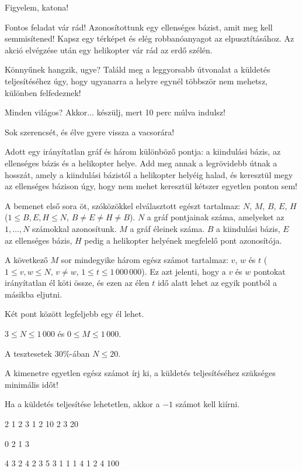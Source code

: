 





\noindent
Figyelem, katona!

\bigskip \noindent
Fontos feladat vár rád! Azonosítottunk egy ellenséges bázist, amit meg kell semmisítened! Kapsz egy térképet és elég robbanóanyagot az elpusztításához. Az akció elvégzése után egy helikopter vár rád az erdő szélén.

\bigskip \noindent
Könnyűnek hangzik, ugye? Találd meg a leggyorsabb útvonalat a küldetés teljesítéséhez úgy, hogy ugyanarra a helyre egynél többször nem mehetsz, különben felfedeznek!

\bigskip \noindent
Minden világos? Akkor... készülj, mert 10 perc múlva indulsz!

\bigskip \noindent
Sok szerencsét, és élve gyere vissza a vacsorára!

Adott egy irányítatlan gráf és három különböző pontja: a kiindulási bázis, az ellenséges bázis és a helikopter helye. Add meg annak a legrövidebb útnak a hosszát, amely a kiindulási bázistól a helikopter helyéig halad, és keresztül megy az ellenséges bázison úgy, hogy nem mehet keresztül kétszer egyetlen ponton sem!

A bemenet első sora öt, szóközökkel elválasztott egészt tartalmaz: $N$, $M$, $B$, $E$, $H$ ($1 \le B, E, H \le N$, $B \neq E \neq H \neq B$). $N$ a gráf pontjainak száma, amelyeket az $1, \ldots, N$ számokkal azonosítunk. $M$ a gráf éleinek száma. $B$ a kiindulási bázis, $E$ az ellenséges bázis, $H$ pedig a helikopter helyének megfelelő pont azonosítója.

A következő $M$ sor mindegyike három egész számot tartalmaz: $v$, $w$ és $t$ ($1 \le v, w \le N$, $v \neq w$, $1 \le t \le 1\,000\,000$). Ez azt jelenti, hogy a $v$ és $w$ pontokat irányítatlan él köti össze, és ezen az élen $t$ idő alatt lehet az egyik pontból a másikba eljutni.

Két pont között legfeljebb egy él lehet.

$3 \le N \le 1\,000$ és $0 \le M \le 1\,000$.

A tesztesetek $30\%$-ában $N\le 20$.

A kimenetre egyetlen egész számot írj ki, a küldetés teljesítéséhez szükséges minimális időt! 

Ha a küldetés teljesítése lehetetlen, akkor a $-1$ számot kell kiírni.


 2 1 2 3
1 2 10
2 3 20
\sampleEND


\bigskip


 0 2 1 3
\sampleEND


\bigskip


 4 3 2 4
2 3 5
3 1 1
1 4 1
2 4 100
\sampleEND


